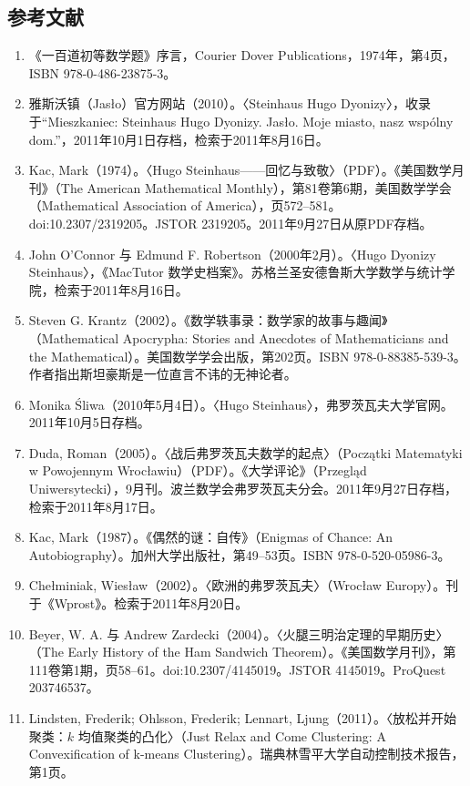\subsection{参考文献}
\begin{enumerate}
  \item 《一百道初等数学题》序言，Courier Dover Publications，1974年，第4页，ISBN 978-0-486-23875-3。
  \item 雅斯沃镇（Jasło）官方网站（2010）。〈Steinhaus Hugo Dyonizy〉，收录于“Mieszkaniec: Steinhaus Hugo Dyonizy. Jasło. Moje miasto, nasz wspólny dom.”，2011年10月1日存档，检索于2011年8月16日。
  \item Kac, Mark（1974）。〈Hugo Steinhaus——回忆与致敬〉（PDF）。《美国数学月刊》（The American Mathematical Monthly），第81卷第6期，美国数学学会（Mathematical Association of America），页572–581。doi:10.2307/2319205。JSTOR 2319205。2011年9月27日从原PDF存档。
  \item John O'Connor 与 Edmund F. Robertson（2000年2月）。〈Hugo Dyonizy Steinhaus〉，《MacTutor 数学史档案》。苏格兰圣安德鲁斯大学数学与统计学院，检索于2011年8月16日。
  \item Steven G. Krantz（2002）。《数学轶事录：数学家的故事与趣闻》（Mathematical Apocrypha: Stories and Anecdotes of Mathematicians and the Mathematical）。美国数学学会出版，第202页。ISBN 978-0-88385-539-3。作者指出斯坦豪斯是一位直言不讳的无神论者。
  \item Monika Śliwa（2010年5月4日）。〈Hugo Steinhaus〉，弗罗茨瓦夫大学官网。2011年10月5日存档。
  \item Duda, Roman（2005）。〈战后弗罗茨瓦夫数学的起点〉（Początki Matematyki w Powojennym Wrocławiu）（PDF）。《大学评论》（Przegląd Uniwersytecki），9月刊。波兰数学会弗罗茨瓦夫分会。2011年9月27日存档，检索于2011年8月17日。
  \item Kac, Mark（1987）。《偶然的谜：自传》（Enigmas of Chance: An Autobiography）。加州大学出版社，第49–53页。ISBN 978-0-520-05986-3。
  \item Chełminiak, Wiesław（2002）。〈欧洲的弗罗茨瓦夫〉（Wrocław Europy）。刊于《Wprost》。检索于2011年8月20日。
  \item Beyer, W. A. 与 Andrew Zardecki（2004）。〈火腿三明治定理的早期历史〉（The Early History of the Ham Sandwich Theorem）。《美国数学月刊》，第111卷第1期，页58–61。doi:10.2307/4145019。JSTOR 4145019。ProQuest 203746537。
  \item Lindsten, Frederik; Ohlsson, Frederik; Lennart, Ljung（2011）。〈放松并开始聚类：$k$ 均值聚类的凸化〉（Just Relax and Come Clustering: A Convexification of k-means Clustering）。瑞典林雪平大学自动控制技术报告，第1页。

\end{enumerate}
